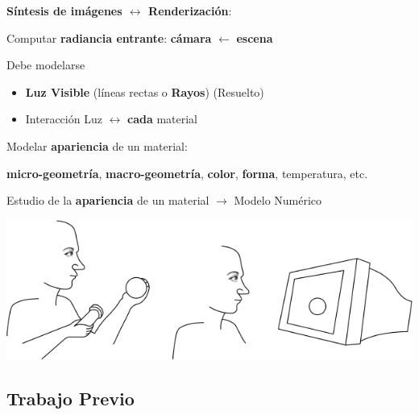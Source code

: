 \documentclass[spanish,unknownkeysallowed,10pt]{beamer}
\begin{document}
\begin{frame}{}

\textbf{Síntesis de imágenes $\leftrightarrow$ Renderización}:

Computar \textbf{radiancia entrante}:  \textbf{cámara}  $\leftarrow$ \textbf{escena}

\vspace{0.2cm}

\begin{block}{Debe modelarse}
\begin{itemize}
\item \textbf{Luz Visible} (líneas rectas o \textbf{Rayos}) (Resuelto)
\item Interacción Luz $\leftrightarrow$ \textbf{cada} material
\end{itemize}
\end{block}

\vspace{0.2cm}

Modelar \textbf{apariencia} de un material:

\textbf{micro-geometría}, \textbf{macro-geometría}, \textbf{color}, \textbf{forma}, temperatura, etc.

\vspace{0.2cm}

Estudio de la \textbf{apariencia} de un material $\rightarrow$ Modelo Numérico

\centerline{\includegraphics[scale = 0.25]{../figures/apariencia}}

\end{frame}

\subsection{Trabajo Previo}
\end{document}
